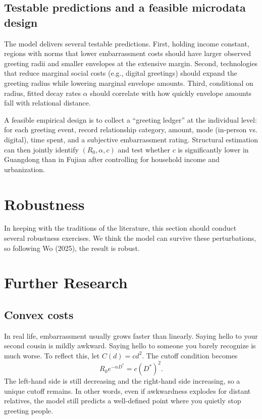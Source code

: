 \documentclass[AER]{AEA}
\begin{document}
\subsection{Testable predictions and a feasible microdata design}
The model delivers several testable predictions. First, holding income constant, regions with norms that lower embarrassment costs should have larger observed greeting radii and smaller envelopes at the extensive margin. Second, technologies that reduce marginal social costs (e.g., digital greetings) should expand the greeting radius while lowering marginal envelope amounts. Third, conditional on radius, fitted decay rates $\alpha$ should correlate with how quickly envelope amounts fall with relational distance. 

A feasible empirical design is to collect a ``greeting ledger'' at the individual level: for each greeting event, record relationship category, amount, mode (in-person vs. digital), time spent, and a subjective embarrassment rating. Structural estimation can then jointly identify $(R_0,\alpha,c)$ and test whether $c$ is significantly lower in Guangdong than in Fujian after controlling for household income and urbanization.

\section{Robustness}
In keeping with the traditions of the literature, this section should conduct several robustness exercises. We think the model can survive these perturbations, so following Wo (2025), the result is robust.

\section{Further Research}

\subsection{Convex costs}
In real life, embarrassment usually grows faster than linearly. Saying hello to your second cousin is mildly awkward. Saying hello to someone you barely recognize is much worse. To reflect this, let $C(d)=cd^2$. The cutoff condition becomes
\[
R_0 e^{-\alpha D^*}=c(D^*)^2.
\]
The left-hand side is still decreasing and the right-hand side increasing, so a unique cutoff remains. In other words, even if awkwardness explodes for distant relatives, the model still predicts a well-defined point where you quietly stop greeting people.
\end{document}
